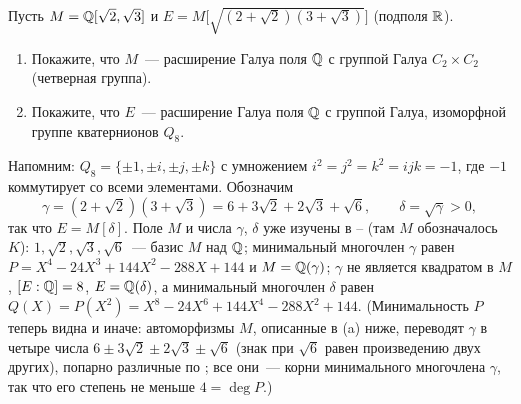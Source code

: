 \begin{exercise}[3-3]
Пусть $M=\mathbb Q[\sqrt2,\sqrt3]$ и $E=M\bigl[\sqrt{(2+\sqrt2)(3+\sqrt3)}\bigr]$ (подполя $\mathbb R$).
\begin{enumerate}[label=(\alph*)]
\item Покажите, что $M$~--- расширение Галуа поля $\mathbb Q$ с группой Галуа $C_2\times C_2$ (четверная группа).
\item Покажите, что $E$~--- расширение Галуа поля $\mathbb Q$ с группой Галуа, изоморфной группе кватернионов $Q_8$.
\end{enumerate}
\end{exercise}

Напомним: $Q_8=\{\pm1,\pm i,\pm j,\pm k\}$ с умножением $i^2=j^2=k^2=ijk=-1$, где $-1$ коммутирует со всеми элементами.
Обозначим
\[
\gamma=(2+\sqrt2)(3+\sqrt3)=6+3\sqrt2+2\sqrt3+\sqrt6,\qquad \delta=\sqrt\gamma>0,
\]
так что $E=M[\delta]$. Поле $M$ и числа $\gamma$, $\delta$ уже изучены в -- (там $M$ обозначалось $K$):
$1,\sqrt2,\sqrt3,\sqrt6$~--- базис $M$ над $\mathbb Q$; минимальный многочлен $\gamma$ равен $P=X^4-24X^3+144X^2-288X+144$ и
$M=\mathbb Q(\gamma)$; $\gamma$ не является квадратом в $M$, $[E:\mathbb Q]=8$, $E=\mathbb Q(\delta)$, а минимальный многочлен $\delta$ равен
$Q(X)=P(X^2)=X^8-24X^6+144X^4-288X^2+144$. (Минимальность $P$ теперь видна и иначе: автоморфизмы $M$, описанные в
(a) ниже, переводят $\gamma$ в четыре числа $6\pm3\sqrt2\pm2\sqrt3\pm\sqrt6$ (знак при $\sqrt6$ равен произведению двух
других), попарно различные по ; все они~--- корни минимального многочлена $\gamma$, так что его степень не меньше
$4=\deg P$.)

